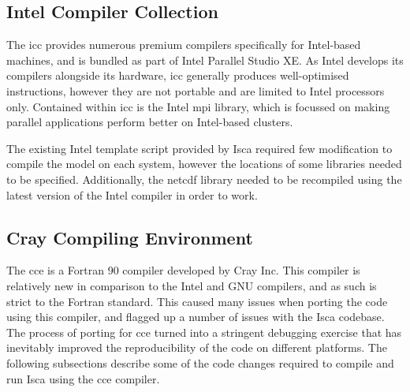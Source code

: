 \documentclass[a4paper,11pt]{report}
\begin{document}
\subsection{Intel Compiler Collection}
The \gls{icc} provides numerous premium compilers specifically for Intel-based machines, and is bundled as part of Intel Parallel Studio XE. As Intel develops its compilers alongside its hardware, \gls{icc} generally produces well-optimised instructions, however they are not portable and are limited to Intel processors only. Contained within \gls{icc} is the Intel \gls{mpi} library, which is focussed on making parallel applications perform better on Intel-based clusters.
\par
The existing Intel template script provided by Isca required few modification to compile the model on each system, however the locations of some libraries needed to be specified. Additionally, the \gls{netcdf} library needed to be recompiled using the latest version of the Intel compiler in order to work. 


\subsection{Cray Compiling Environment}
The \gls{cce} is a Fortran 90 compiler developed by Cray Inc. This compiler is relatively new in comparison to the Intel and GNU compilers, and as such is strict to the Fortran standard. This caused many issues when porting the code using this compiler, and flagged up a number of issues with the Isca codebase. The process of porting for \gls{cce} turned into a stringent debugging exercise that has inevitably improved the reproducibility of the code on different platforms. The following subsections describe some of the code changes required to compile and run Isca using the \gls{cce} compiler.
\end{document}
